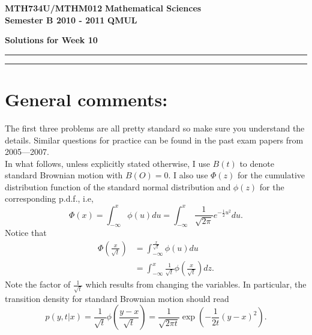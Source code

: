 \documentclass[11pt,a4paper]{article}
\begin{document}
  \textbf{MTH734U/MTHM012} \hfill \textbf{Mathematical Sciences}\\
  \textbf{Semester B 2010 - 2011} \hfill \textbf{QMUL}
  \begin{center}
    \textbf{\huge Solutions for Week 10}
  \end{center}
  \hrule \vspace{2mm} \hrule

  \section*{General comments:}
  The first three problems are all pretty standard so make sure you understand the details. Similar questions for practice can be found in the past exam papers from 2005—2007.\\
  In what follows, unless explicitly stated otherwise, I use $B(t)$ to denote standard Brownian motion with $B(O)= 0$. I also use $\Phi(z)$ for the cumulative distribution function of the standard normal distribution and $\phi(z)$ for the corresponding p.d.f., i.e,
  $$
  \Phi(x) = \int_{-\infty}^x\phi(u)du = \int_{-\infty}^x\frac{1}{\sqrt{2\pi}}e^{-\frac{1}{2}u^2}du.
  $$
  Notice that
  \begin{align*}
    \Phi\left(\frac{x}{\sqrt{t}}\right)
    &= \int_{-\infty}^\frac{x}{\sqrt{t}}\phi(u)du\\
    &= \int_{-\infty}^x\frac{1}{\sqrt{t}}\phi\left(\frac{x}{\sqrt{t}}\right)dz.
  \end{align*}
  Note the factor of $\frac{1}{\sqrt{t}}$ which results from changing the variables. In particular, the transition density for standard Brownian motion should read
  $$
  p(y, t|x) = \frac{1}{\sqrt{t}}\phi\left(\frac{y - x}{\sqrt{t}}\right) = \frac{1}{\sqrt{2\pi t}}\exp\left(-\frac{1}{2t}(y - x)^2\right).
  $$
\end{document}
